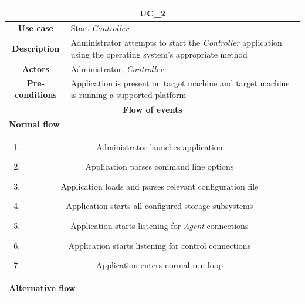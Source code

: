 \documentclass[12pt,a4paper,table]{article}
\begin{document}
            \vspace{0.5cm}
            \noindent
            \begin{longtable}{ |c|p{11.8cm}| }
                \hline
                \multicolumn{2}{|c|}{\cellcolor{lime} \textbf{UC\_2}}\\ \hline
                \cellcolor[gray]{0.9} \textbf{Use case} & Start \textit{Controller}\\ \hline
                \cellcolor[gray]{0.9} \textbf{Description} & Administrator attempts to start the \textit{Controller} application using the operating system's appropriate method\\ \hline
                \cellcolor[gray]{0.9} \textbf{Actors} & Administrator, \textit{Controller}\\ \hline
                \cellcolor[gray]{0.9} \textbf{Pre-conditions} & Application is present on target machine and target machine is running a supported platform\\ \hline
                \multicolumn{2}{|c|}{\cellcolor[gray]{0.9} \textbf{Flow of events}}\\ \hline
                \multicolumn{2}{|l|}{\cellcolor[gray]{0.9} \textbf{Normal flow}}\\ \hline
                \multicolumn{2}{|p{14cm}|}{
                    \begin{enumerate}
                        \item Administrator launches application
                        \item Application parses command line options
                        \item Application loads and parses relevant configuration file
                        \item Application starts all configured storage subsystems
                        \item Application starts listening for \textit{Agent} connections
                        \item Application starts listening for control connections
                        \item Application enters normal run loop
                    \end{enumerate}
                }\\ \hline
                \multicolumn{2}{|l|}{\cellcolor[gray]{0.9} \textbf{Alternative flow}}\\ \hline
                \multicolumn{2}{|p{14cm}|}{
                    \begin{itemize}

\end{itemize}}
\end{longtable}
\end{document}

